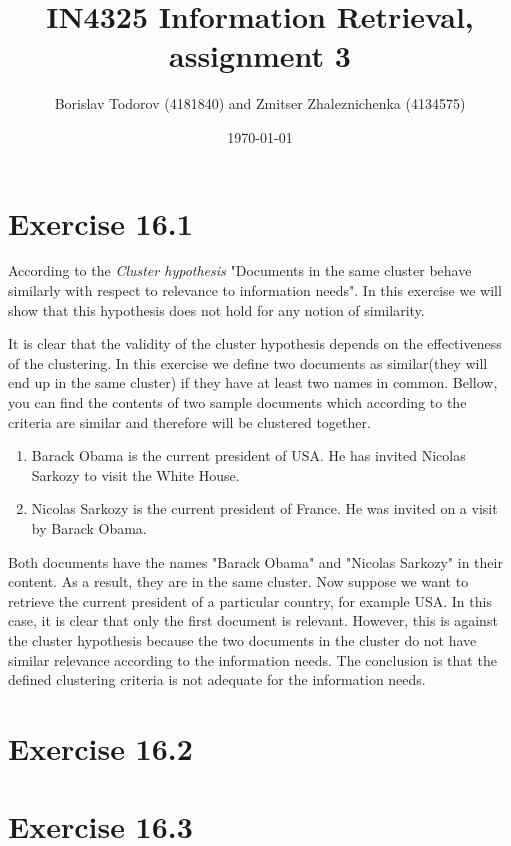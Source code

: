 \documentclass[a4paper, notitlepage]{article}
\begin{document}
\title{IN4325 Information Retrieval, assignment 3}
\author{Borislav Todorov (4181840) and Zmitser Zhaleznichenka (4134575)}
\date{\today}
\maketitle

\section{Exercise 16.1}

According to the \emph{Cluster hypothesis} "Documents in the same cluster behave similarly with respect to relevance to information needs". In this exercise we will show that this hypothesis does not hold for any notion of similarity.

It is clear that the validity of the cluster hypothesis depends on the effectiveness of the clustering. In this exercise we define two documents as similar(they will end up in the same cluster) if they have at least two names in common. Bellow, you can find the contents of two sample documents which according to the criteria are similar and therefore will be clustered together.

\begin{enumerate}
	\item Barack Obama is the current president of USA. He has invited Nicolas Sarkozy to visit the White House.
	\item Nicolas Sarkozy is the current president of France. He was invited on a visit by Barack Obama.
\end{enumerate}

Both documents have the names "Barack Obama" and "Nicolas Sarkozy" in their content. As a result, they are in the same cluster. Now suppose we want to retrieve the current president of a particular country, for example USA. In this case, it is clear that only the first document is relevant. However, this is against the cluster hypothesis because the two documents in the cluster do not have similar relevance according to the information needs. The conclusion is that the defined clustering criteria is not adequate for the information needs.

\section{Exercise 16.2}


\section{Exercise 16.3}
\end{document}
